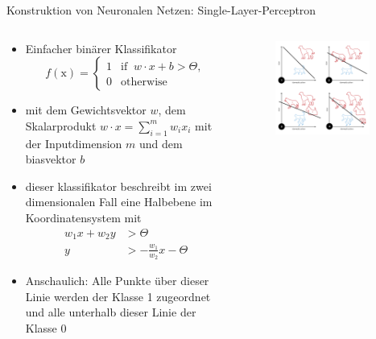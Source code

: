 \documentclass[aspectratio=1610, xcolor=dvipsnames, 9pt]{beamer}
\begin{document}
\begin{frame}{Konstruktion von Neuronalen Netzen: Single-Layer-Perceptron}
        \begin{columns}
          \begin{column}{0.7\textwidth}
            \begin{itemize}
              \item Einfacher binärer Klassifikator
              \begin{equation}
                        f(\text{x}) = \begin{cases}1 & \text{if }\ w \cdot x + b > \Theta,\\0 & \text{otherwise}\end{cases}
                    \end{equation}
              \item mit dem Gewichtsvektor $w$, dem Skalarprodukt $w\cdot x= \sum_{i=1}^{m} w_i x_i$ mit der Inputdimension $m$ und dem biasvektor $b$ \newline
              \item dieser klassifikator beschreibt im zwei dimensionalen Fall eine Halbebene im Koordinatensystem mit 
              \begin{align}
                w_1 x + w_2 y &> \Theta \\
                y &> - \frac{w_1}{w_2} x -\Theta
              \end{align}
              \item Anschaulich: Alle Punkte über dieser Linie werden der Klasse 1 zugeordnet und alle unterhalb dieser Linie der Klasse 0
            \end{itemize}
          \end{column}
          \begin{column}{0.3\textwidth}
       \begin{figure}
       \centering
                   \includegraphics[width=0.9\textwidth]{images/Perceptron_example.svg.png}

\end{figure}
\end{column}
\end{columns}
\end{frame}
\end{document}
